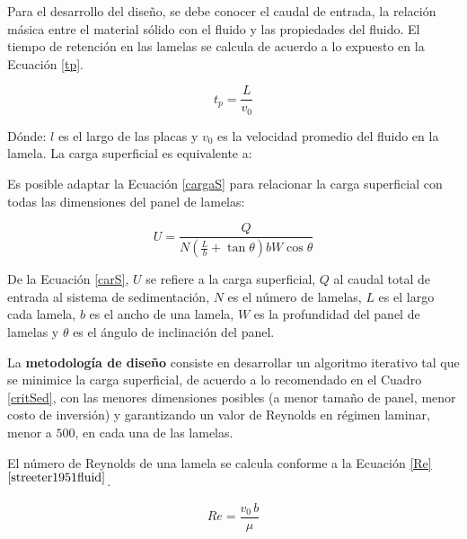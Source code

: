 \noindent
\justify

Para el desarrollo del dise\~no, se debe conocer el caudal de entrada, la relaci\'on m\'asica entre el material s\'olido con el fluido y las propiedades del fluido. El tiempo de retenci\'on en las lamelas se calcula de acuerdo a lo expuesto en la Ecuaci\'on \ref{tp}.

\begin{equation}
	t_p = \frac{L}{v_0}
	\label{tp}
\end{equation}

\noindent
\justify

D\'onde: $l$ es el largo de las placas y $v_0$ es la velocidad promedio del fluido en la lamela. La carga superficial es equivalente a:

\noindent
\justify

Es posible adaptar la Ecuaci\'on \ref{cargaS} para relacionar la carga superficial con todas las dimensiones del panel de lamelas:

\begin{equation}
	U = \frac{Q}{N \left(\frac{L}{b} + \tan \theta \right) b W \cos \theta}
	\label{carS}
\end{equation}

\noindent
\justify

De la Ecuaci\'on \ref{carS}, $U$ se refiere a la carga superficial, $Q$ al caudal total de entrada al sistema de sedimentaci\'on, $N$ es el n\'umero de lamelas, $L$ es el largo cada lamela, $b$ es el ancho de una lamela, $W$ es la profundidad del panel de lamelas y $\theta$ es el \'angulo de inclinaci\'on del panel.

\noindent
\justify

La \textbf{metodolog\'ia de dise\~no} consiste en desarrollar un algoritmo iterativo tal que se minimice la carga superficial, de acuerdo a lo recomendado en el Cuadro \ref{critSed}, con las menores dimensiones posibles (a menor tama\~no de panel, menor costo de inversi\'on) y garantizando un valor de Reynolds en r\'egimen laminar, menor a $500$, en cada una de las lamelas.

\noindent
\justify

El n\'umero de Reynolds de una lamela se calcula conforme a la Ecuaci\'on \ref{Re}$^{\cite{streeter1951fluid}}$.

\begin{equation}
	Re = \frac{v_0 \, b}{\mu}
	\label{Reynolds}
\end{equation}

\noindent
\justify

